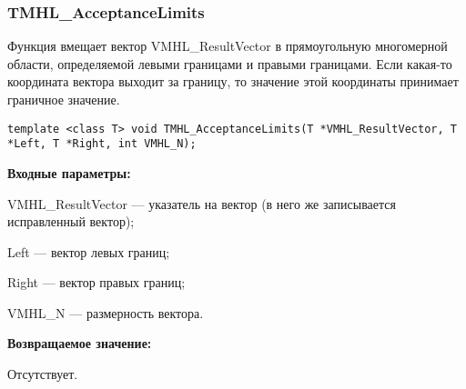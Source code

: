 \documentclass[a4paper,12pt]{article}
\begin{document}
\subsubsection{TMHL\_AcceptanceLimits}\label{TMHL_AcceptanceLimits}

Функция вмещает вектор VMHL\_ResultVector в прямоугольную многомерной области, определяемой левыми границами и правыми границами. Если какая-то координата вектора выходит за границу, то значение этой координаты принимает граничное значение.


\begin{lstlisting}[label=code_syntax_TMHL_AcceptanceLimits,caption=Синтаксис]
template <class T> void TMHL_AcceptanceLimits(T *VMHL_ResultVector, T *Left, T *Right, int VMHL_N);
\end{lstlisting}

\textbf{Входные параметры:}  
 
VMHL\_ResultVector --- указатель на вектор (в него же записывается исправленный вектор);
 
Left --- вектор левых границ;
 
Right --- вектор правых границ;
 
VMHL\_N --- размерность вектора.

\textbf{Возвращаемое значение:}

Отсутствует.
\end{document}
